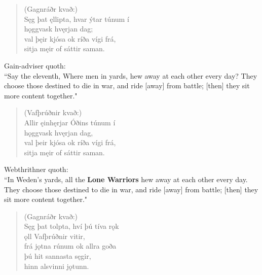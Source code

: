 \begin{verse}
(Gagnráðr kvað:) \\%
\bva Sęg þat ęllipta, \hld hvar ýtar túnum í \\%
\ind hǫggvask hvęrjan dag; \\%
val þęir kjósa \hld ok ríða vígi frá, \\%
\ind sitja męir of sáttir saman.\footnotemark[35]\\%
\end{verse}

\bvb Gain-adviser quoth: \\ “Say the eleventh, Where men in yards, hew away at each other every day? They choose those destined to die in war, and ride [away] from battle; [then] they sit more content together." \\

\begin{verse}
(Vafþrúðnir kvað:) \\%
\bva Allir ęinhęrjar \hld Óðins túnum í \\%
\ind hǫggvask hvęrjan dag, \\%
val þeir kjósa \hld ok ríða vígi frá, \\%
\ind sitja męir of sáttir saman.\\%
\end{verse}

\bvb Webthrithner quoth: \\ “In Weden's yards, all the \textbf{Lone Warriors} hew away at each other every day. They choose those destined to die in war, and ride [away] from battle; [then] they sit more content together." \\

\begin{verse}
(Gagnráðr kvað:) \\%
\bva Sęg þat tolpta, \hld hví þú tíva rǫk \\%
\ind ǫll Vafþrúðnir vitir, \\%
frá jǫtna rúnum \hld ok allra goða \\%
\ind þú hit sannasta sęgir, \\%
\ind hinn alsvinni jǫtunn.\\%
\end{verse}

